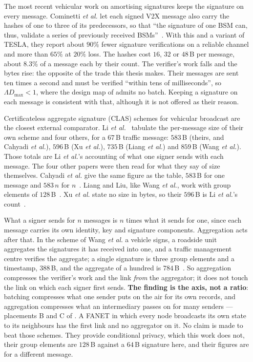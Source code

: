 The most recent vehicular work on amortising signatures keeps the signature on every message.
Cominetti \emph{et al.} let each signed V2X message also carry the hashes of one to three of its
predecessors, so that ``the signature of one BSM can, thus, validate a series of previously
received BSMs''~\cite{cominetti2022chaining}. With this and a variant of TESLA, they report about
$90\%$ fewer signature verifications on a reliable channel and more than $65\%$ at $20\%$ loss.
The hashes cost $16$, $32$ or $48$\,B per message, about $8.3\%$ of a message each by their
count. The verifier's work falls and the bytes rise: the opposite of the trade this thesis makes.
Their messages are sent ten times a second and must be verified ``within tens of milliseconds'',
so $\Lambda D_{\max} < 1$, where the design map of  admits no batch. Keeping a
signature on each message is consistent with that, although it is not offered as their reason.

Certificateless aggregate signature (CLAS) schemes for vehicular broadcast are the closest
external comparator. Li \emph{et al.}~\cite{li2025clas} tabulate the per-message size of their
own scheme and four others, for a $67$\,B traffic message: $583$\,B (theirs, and Cahyadi
\emph{et al.}), $596$\,B (Xu \emph{et al.}), $735$\,B (Liang \emph{et al.}) and $859$\,B (Wang
\emph{et al.}). Those totals are Li \emph{et al.}'s accounting of what one signer sends with
each message. The four other papers were then read for what they say of size themselves.
Cahyadi \emph{et al.} give the same figure as the table, $583$\,B for one message and $583\,n$
for $n$~\cite{cahyadi2022clas}. Liang and Liu, like Wang \emph{et al.}, work with group
elements of $128$\,B~\cite{liang2023clas}. Xu \emph{et al.} state no size in bytes, so their
$596$\,B is Li \emph{et al.}'s count~\cite{xu2020clas}.

What a signer sends for $n$ messages is $n$ times what it sends for one, since each message
carries its own identity, key and signature components. Aggregation acts after that. In the
scheme of Wang \emph{et al.} a vehicle signs, a roadside unit aggregates the signatures it
has received into one, and a traffic management centre verifies the aggregate; a single
signature is three group elements and a timestamp, $388$\,B, and the aggregate of a hundred
is $784$\,B~\cite{wang2022clas}. So aggregation compresses the verifier's work and the link
\emph{from} the aggregator; it does not touch the link on which each signer first sends.
\textbf{The finding is the axis, not a ratio}: batching compresses what one sender puts on the
air for its own records, and aggregation compresses what an intermediary passes on for many
senders --- placements B and C of . A FANET in which every node broadcasts
its own state to its neighbours has the first link and no aggregator on it. No claim is made
to beat those schemes. They provide conditional privacy, which this work does not, their group elements are
$128$\,B against a $64$\,B signature here, and their figures are for a different message.

